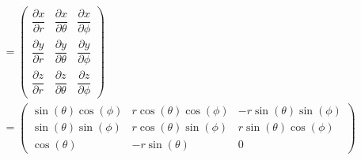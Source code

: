 \documentclass[11pt]{article}
\numberwithin{equation}{section}
\begin{document}
\begin{enumerate}[(a)]
\begin{align*}
&= \left(\begin{array}{ccc}
	\dfrac{\partial x}{\partial r}	&\dfrac{\partial x}{\partial \theta}	&\dfrac{\partial x}{\partial \phi}\\
	\dfrac{\partial y}{\partial r}	&\dfrac{\partial y}{\partial \theta}	&\dfrac{\partial y}{\partial \phi}\\
	\dfrac{\partial z}{\partial r}	&\dfrac{\partial z}{\partial \theta}	&\dfrac{\partial z}{\partial \phi}
	\end{array}\right)\\
&= \left(\begin{array}{ccc}
	\sin(\theta)\cos(\phi)	&r\cos(\theta)\cos(\phi)	&-r\sin(\theta)\sin(\phi)\\
	\sin(\theta)\sin(\phi)	&r\cos(\theta)\sin(\phi)	&r\sin(\theta)\cos(\phi)\\	
	\cos(\theta)		&-r\sin(\theta)			&0
	\end{array}\right)
\end{align*}


\end{enumerate}
\end{document}
